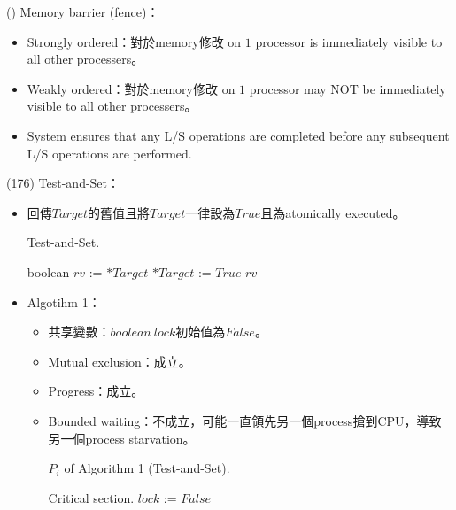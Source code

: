 \begin{theorem}{()} Memory barrier (fence)：\begin{itemize}
        \item Strongly ordered：對於memory修改 on $1$ processor is immediately visible to all other processers。
        \item Weakly ordered：對於memory修改 on $1$ processor may NOT be immediately visible to all other processers。
        \item System ensures that any L/S operations are completed before any subsequent L/S operations are performed.
    \end{itemize}
\end{theorem}

\begin{theorem}{(176)} Test-and-Set：\begin{itemize}
        \item 回傳$Target$的舊值且將$Target$一律設為$True$且為atomically executed。
        \begin{algorithm}[H]
            \caption{Test-and-Set.}
            \begin{algorithmic}[1]
                \State boolean $rv$ := $*Target$
                \State $*Target$ := $True$
                \State \Return $rv$
                \EndFunction
            \end{algorithmic}
        \end{algorithm}
        \item Algotihm 1：\begin{itemize}
            \item 共享變數：$boolean \ lock$初始值為$False$。
            \item Mutual exclusion：成立。
            \item Progress：成立。
            \item Bounded waiting：不成立，可能一直領先另一個process搶到CPU，導致另一個process starvation。
            \begin{algorithm}[H]
                \caption{$P_i$ of Algorithm 1 (Test-and-Set).}
                \label{algo:test-and-set-algo-1}
                \begin{algorithmic}[1]
                    \Repeat
                        \EndWhile
                        \State Critical section.
                        \State $lock$ := $False$

\end{algorithmic}
\end{algorithm}
\end{itemize}
\end{itemize}
\end{theorem}
